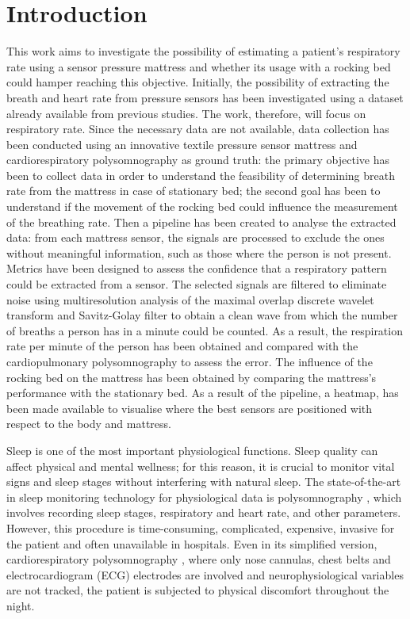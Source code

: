 
\chapter{Introduction}


This work aims to investigate the possibility of estimating a patient's respiratory rate using a sensor pressure mattress and whether its usage with a rocking bed could hamper reaching this objective. 
Initially, the possibility of extracting the breath and heart rate from pressure sensors has been investigated using a dataset already available from previous studies. The work, therefore, will focus on respiratory rate. Since the necessary data are not available, data collection has been conducted using an innovative textile pressure sensor mattress and cardiorespiratory polysomnography as ground truth: the primary objective has been to collect data in order to understand the feasibility of determining breath rate from the mattress in case of stationary bed; the second goal has been to understand if the movement of the rocking bed could influence the measurement of the breathing rate. 
Then a pipeline has been created to analyse the extracted data: from each mattress sensor, the signals are processed to exclude the ones without meaningful information, such as those where the person is not present. Metrics have been designed to assess the confidence that a respiratory pattern could be extracted from a sensor. The selected signals are filtered to eliminate noise using multiresolution analysis of the maximal overlap discrete wavelet transform and Savitz-Golay filter to obtain a clean wave from which the number of breaths a person has in a minute could be counted. As a result, the respiration rate per minute of the person has been obtained and compared with the cardiopulmonary polysomnography to assess the error. The influence of the rocking bed on the mattress has been obtained by comparing the mattress's performance with the stationary bed. As a result of the pipeline, a heatmap, has been made available to visualise where the best sensors are positioned with respect to the body and mattress.
\newpage

Sleep is one of the most important physiological functions. Sleep quality can affect physical and mental wellness; for this reason, it is crucial to monitor vital signs and sleep stages without interfering with natural sleep. 
The state-of-the-art in sleep monitoring technology for physiological data is polysomnography \cite{Penzel2016ModulationsPolysomnography}, which involves recording sleep stages, respiratory and heart rate, and other parameters. However, this procedure is time-consuming, complicated, expensive, invasive for the patient and often unavailable in hospitals. Even in its simplified version, cardiorespiratory polysomnography \cite{CallejaComparisonApnoea}, where only nose cannulas, chest belts and electrocardiogram (ECG) electrodes are involved and neurophysiological variables are not tracked, the patient is subjected to physical discomfort throughout the night.


